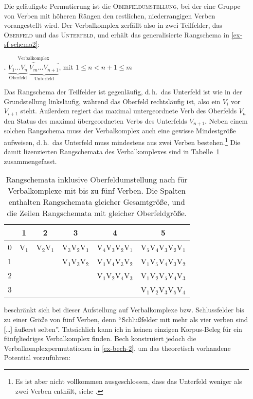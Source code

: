 Die geläufigste Permutierung ist die \textsc{Oberfeldumstellung}, bei der eine Gruppe von Verben mit höheren Rängen den restlichen, niederrangigen Verben vorangestellt wird. Der Verbalkomplex zerfällt also in zwei Teilfelder, das \textsc{Oberfeld} und das \textsc{Unterfeld}, und erhält das generalisierte Rangschema in \ref{ex-sf-schema2}: 

\ex.   $\overbrace{\underbrace{V_1 ... V_{n}}_{\text{Oberfeld}} \ \underbrace{V_{m} ... V_{n+1}}_{\text{Unterfeld}}}^{\text{Verbalkomplex}}$, mit $1 \leq n < n+1 \leq m$ \label{ex-sf-schema2}

Das Rangschema der Teilfelder ist gegenläufig, d.\,h.\ das Unterfeld ist wie in der Grundstellung linksläufig, während das Oberfeld rechtsläufig ist, also ein $V_i$ vor $V_{i+1}$ steht. Au\ss erdem regiert das maximal untergeordnete Verb des Oberfelds $V_n$ den Status des maximal übergeordneten Verbs des Unterfelds $V_{n+1}$. Neben einem solchen Rangschema muss der Verbalkomplex auch eine gewisse Mindestgrö\ss e aufweisen, d.\,h.\ das Unterfeld muss mindestens aus zwei Verben bestehen.\footnote{Es ist aber nicht vollkommen ausgeschlossen, dass das Unterfeld weniger als zwei Verben enthält, siehe \citet[83]{Meurers:99}.} Die damit lizenzierten Rangschemata des Verbalkomplexes sind in Tabelle~\ref{fig-oberfeld} zusammengefasst.
\begin{table}[t]
\begin{center}

\begin{tabular}{c||c|c|c|c|c}
& 1	& 2	& 3	& 4	& 5	\\
\hline\hline
0	& V$_1$	& V$_2$V$_1$ & V$_3$V$_2$V$_1$ & V$_4$V$_3$V$_2$V$_1$ & V$_5$V$_4$V$_3$V$_2$V$_1$ \\
\hline
1	& 	& 	     & V$_1$V$_3$V$_2$ & V$_1$V$_4$V$_3$V$_2$ & V$_1$V$_5$V$_4$V$_3$V$_2$ \\
\hline
2	&	&	     &		       & V$_1$V$_2$V$_4$V$_3$ & V$_1$V$_2$V$_5$V$_4$V$_3$ \\
\hline
3	& 	& 	     & 		       & 		      & V$_1$V$_2$V$_3$V$_5$V$_4$ \\
\end{tabular} 

\end{center}
\caption{Rangschemata inklusive Oberfeldumstellung nach \citet[\S 61]{Bech:55} für Verbalkomplexe mit bis zu fünf Verben. Die Spalten enthalten Rangschemata gleicher Gesamtgrö\ss e, und die Zeilen Rangschemata mit gleicher Oberfeldgrö\ss e.\label{fig-oberfeld}}
\end{table}
\citet[\S 61]{Bech:55} beschränkt sich bei dieser Aufstellung auf Verbalkomplexe bzw. Schlussfelder bis zu einer Grö\ss e von fünf Verben, denn "`Schlu\ss felder mit mehr als vier verben sind [\ldots] äu\ss erst selten"'. Tatsächlich kann ich in \cite{Bech:55} keinen einzigen Korpus-Beleg für ein fünfgliedriges Verbalkomplex finden. Bech konstruiert jedoch die Verbalkomplexpermutationen in \ref{ex-bech-2}, um das theoretisch vorhandene Potential vorzuführen:

